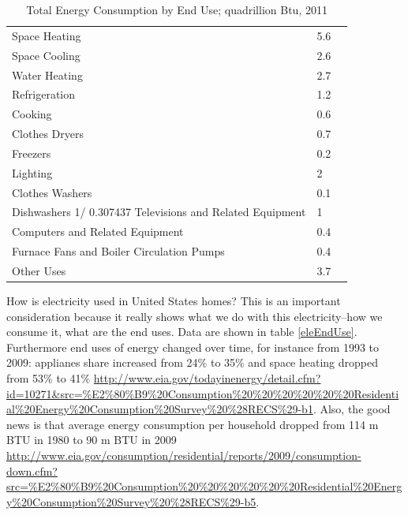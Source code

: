 \documentclass[10pt, letterpaper]{article}
\begin{document}
\begin{spacing}{1.4}
\begin{table}[H]\centering\footnotesize
\caption{\label{freq_im_god} Total Energy Consumption by End Use; quadrillion
  Btu, 2011}
\begin{tabular}{lll}   \hline 
Space Heating&	5.6\\
Space Cooling&	2.6\\
Water Heating&	2.7\\
Refrigeration&	1.2\\
Cooking&	0.6\\
Clothes Dryers&	0.7\\
Freezers&	0.2\\
Lighting&	2\\
Clothes Washers&	0.1\\
Dishwashers 1/	0.307437
Televisions and Related Equipment&	1\\
Computers and Related Equipment &	0.4\\
Furnace Fans and Boiler Circulation Pumps&	0.4\\
Other Uses&	3.7\\\hline
\end{tabular}\end{table}

How is electricity used in United States homes? This is an important
consideration because it really shows what we do with this electricity--how we
consume it, what are the end uses. Data are shown in table
\ref{eleEndUse}. Furthermore end uses of energy changed over time, for instance
 from 1993 to 2009: applianes share increased from 24\% to 35\% and space
 heating dropped from 53\% to 41\%
 \url{http://www.eia.gov/todayinenergy/detail.cfm?id=10271&src=%E2%80%B9%20Consumption%20%20%20%20%20%20Residential%20Energy%20Consumption%20Survey%20%28RECS%29-b1}. 
Also, the good news is that average energy consumption per household dropped from 114 m BTU in 1980 to
90 m BTU in 2009 \url{http://www.eia.gov/consumption/residential/reports/2009/consumption-down.cfm?src=%E2%80%B9%20Consumption%20%20%20%20%20%20Residential%20Energy%20Consumption%20Survey%20%28RECS%29-b5}.  



\end{spacing}
\end{document}

